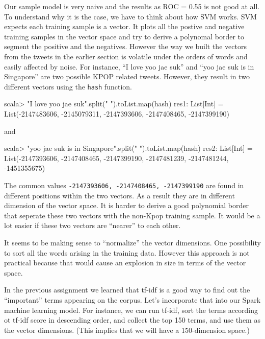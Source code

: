 \documentclass[10pt]{article}
\begin{document}
Our sample model is very naive and the results as ROC = 0.55 is not
good at all. To understand
why it is the case, we have to think about how SVM works. SVM expects
each training sample is a vector. It plots all the postive and
negative training samples in the vector space and try to derive a
polynomal border to segment the positive and the negatives.  However
the way we built the vectors from the tweets in the earlier section is
volatile under the orders of words and easily affected by noise. For
instance, 
``I love yoo jae suk'' and  ``yoo jae suk is in Singapore'' are two
possible KPOP related tweets. However, they result in two different
vectors using the {\tt hash} function. 
\begin{code}

scala> "I love yoo jae suk".split(" ").toList.map(hash)
res1: List[Int] = List(-2147483606, -2145079311, -2147393606, -2147408465, -2147399190)
\end{code}
and 
\begin{code}

scala> "yoo jae suk is in Singapore".split(" ").toList.map(hash)
res2: List[Int] = List(-2147393606, -2147408465, -2147399190,
-2147481239, -2147481244, -1451355675)
\end{code}



The common values {\tt -2147393606, -2147408465, -2147399190} are
found in different positions within the two vectors. As a result they are in different
dimension of the vector space. It is harder to derive a good
polynomial border that seperate these two vectors with the non-Kpop
training sample. It would be a lot easier if these two vectors are
``nearer'' to each other.

It seems to be making sense to ``normalize'' the vector dimensions. One
possibility to sort all the words arising in the training
data. However this approach is not practical because that would cause
an explosion in size in terms of the vector space. 

In the previous assignment we learned that tf-idf is a good way to find out the
``important'' terms appearing on the corpus. Let's incorporate that
into our Spark machine learning model. For instance, we can run
tf-idf, sort the terms according ot tf-idf score in descending order, 
and collect the top 150 terms, and use them as the vector
dimensions. (This implies that we will have a 150-dimension space.)
\end{document}
